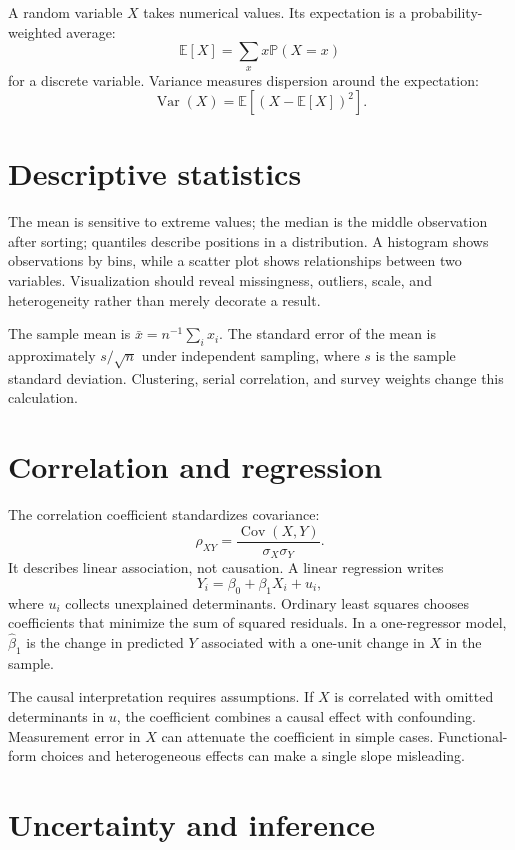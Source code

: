\documentclass[11pt,oneside,openany]{book}
\newcommand{\E}{\mathbb{E}}
\newcommand{\Prob}{\mathbb{P}}
\begin{document}
A random variable $X$ takes numerical values. Its expectation is a probability-weighted average:
\[
  \E[X]=\sum_x x\Prob(X=x)
\]
for a discrete variable. Variance measures dispersion around the expectation:
\[
  \operatorname{Var}(X)=\E[(X-\E[X])^2].
\]

\section{Descriptive statistics}

The mean is sensitive to extreme values; the median is the middle observation after sorting; quantiles describe positions in a distribution. A histogram shows observations by bins, while a scatter plot shows relationships between two variables. Visualization should reveal missingness, outliers, scale, and heterogeneity rather than merely decorate a result.

The sample mean is $\bar{x}=n^{-1}\sum_i x_i$. The standard error of the mean is approximately $s/\sqrt{n}$ under independent sampling, where $s$ is the sample standard deviation. Clustering, serial correlation, and survey weights change this calculation.

\section{Correlation and regression}

The correlation coefficient standardizes covariance:
\[
  \rho_{XY}=\frac{\operatorname{Cov}(X,Y)}{\sigma_X\sigma_Y}.
\]
It describes linear association, not causation. A linear regression writes
\[
  Y_i=\beta_0+\beta_1X_i+u_i,
\]
where $u_i$ collects unexplained determinants. Ordinary least squares chooses coefficients that minimize the sum of squared residuals. In a one-regressor model, $\hat{\beta}_1$ is the change in predicted $Y$ associated with a one-unit change in $X$ in the sample.

The causal interpretation requires assumptions. If $X$ is correlated with omitted determinants in $u$, the coefficient combines a causal effect with confounding. Measurement error in $X$ can attenuate the coefficient in simple cases. Functional-form choices and heterogeneous effects can make a single slope misleading.

\section{Uncertainty and inference}
\end{document}
